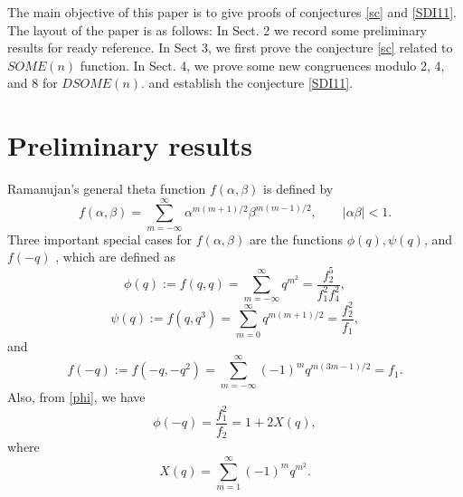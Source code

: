 \documentclass[12pt]{article}
\numberwithin{equation}{section}
\theoremstyle{definition}
\theoremstyle{remark}
\numberwithin{equation}{section}
\begin{document}
The main objective of this paper is to give  proofs of conjectures \eqref{sc} and \eqref{SDI11}.
The layout of the paper is as follows:  In Sect. 2 we record some preliminary results for ready reference. In Sect 3, we first prove the conjecture \eqref{sc} related to $SOME(n)$ function. In Sect. 4,  we prove some new congruences modulo 2, 4, and 8 for $DSOME(n)$. and establish the conjecture  \eqref{SDI11}. 

\section{Preliminary results}
Ramanujan's general theta function $f(\alpha, \beta)$ \cite[p. 34, (18.1)]{BBC} is defined by
$$
   f(\alpha, \beta) = \sum_{m=-\infty}^{\infty} \alpha^{m(m+1)/2} \beta^{m(m-1)/2}, \qquad |\alpha\beta| < 1.
$$
Three important special cases for $f(\alpha, \beta)$ are the functions $\phi(q), \psi(q)$, and $f(-q)$ \cite[p. 35, Entry 18]{BBC}, which are defined as
\begin{equation}\label{phi}
    \phi(q) := f(q, q) = \sum_{m=-\infty}^{\infty} q^{m^2} = \dfrac{f_2^5}{f_1^2f_4^2},
\end{equation}
    $$\psi(q) := f(q, q^3) = \sum_{m=0}^{\infty} q^{m(m+1)/2} = \dfrac{f_2^2}{f_1},$$
and 
\begin{equation}\label{DSE19}
    f(-q) := f(-q, -q^2) = \sum_{m=-\infty}^{\infty} (-1)^m q^{m(3m-1)/2} = f_1.
\end{equation}
Also, from \eqref{phi}, we have 
\begin{equation}\label{DSE3}
\phi(-q)=\dfrac{f_1^2}{f_2}
=1+2X(q),
\end{equation}
where 
\begin{equation}\label{xq}
X(q)=\sum_{m=1}^{\infty}(-1)^m q^{m^2}.
\end{equation}
\end{document}
